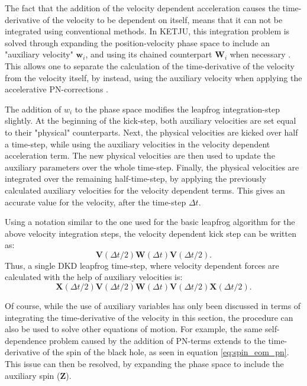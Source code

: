 \documentclass[english, twoside]{HYgradu}
\begin{document}
The fact that the addition of the velocity dependent acceleration causes the time-derivative of the velocity to be dependent on itself, means that it can not be integrated using conventional methods. In KETJU, this integration problem is solved through expanding the position-velocity phase space to include an "auxiliary velocity" $\mathbf{w}_i$, and using its chained counterpart $\mathbf{W}_i$ when necessary \citep{Rantala2017KETJU}. This allows one to separate the calculation of the time-derivative of the velocity from the velocity itself, by instead, using the auxiliary velocity when applying the accelerative PN-corrections \citep{Hellstrom2010, Pihajoki2015}.

The addition of $w_i$ to the phase space modifies the leapfrog integration-step slightly. At the beginning of the kick-step, both auxiliary velocities are set equal to their "physical" counterparts. Next, the physical velocities are kicked over half a time-step, while using the auxiliary velocities in the velocity dependent acceleration term. The new physical velocities are then used to update the auxiliary parameters over the whole time-step. Finally, the physical velocities are integrated over the remaining half-time-step, by applying the previously calculated auxiliary velocities for the velocity dependent terms. This gives an accurate value for the velocity, after the time-step $\Delta t$.

Using a notation similar to the one used for the basic leapfrog algorithm for the above velocity integration steps, the velocity dependent kick step can be written as:
\begin{equation}
\mathbf{V}(\Delta t/2) \mathbf{W}(\Delta t) \mathbf{V}(\Delta t/2).
\end{equation}
Thus, a single DKD leapfrog time-step, where velocity dependent forces are calculated with the help of auxiliary velocities is:
\begin{equation}
\mathbf{X}(\Delta t/2) \mathbf{V}(\Delta t/2) \mathbf{W}(\Delta t) \mathbf{V}(\Delta t/2) \mathbf{X}(\Delta t/2).
\end{equation}

Of course, while the use of auxiliary variables has only been discussed in terms of integrating the time-derivative of the velocity in this section, the procedure can also be used to solve other equations of motion. For example, the same self-dependence problem caused by the addition of PN-terms extends to the time-derivative of the spin of the black hole, as seen in equation \ref{eq:spin_eom_pn}. This issue can then be resolved, by expanding the phase space to include the auxiliary spin ($\mathbf{Z}$).
\end{document}
